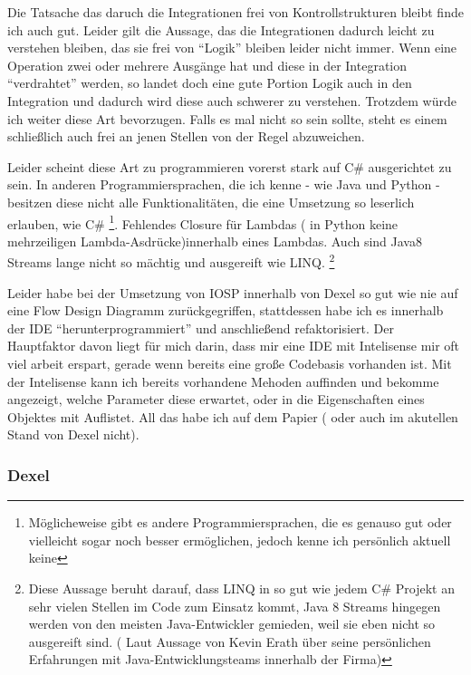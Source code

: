 Die Tatsache das daruch die Integrationen frei von Kontrollstrukturen bleibt finde ich auch gut. 
Leider gilt die Aussage, das die Integrationen dadurch leicht zu verstehen bleiben, das sie frei von \enquote{Logik} bleiben leider nicht immer. Wenn eine Operation zwei oder mehrere Ausgänge hat und diese in der Integration \enquote{verdrahtet} werden, so landet doch eine gute Portion Logik auch in den Integration und dadurch wird diese auch schwerer zu verstehen. 
Trotzdem würde ich weiter diese Art bevorzugen. Falls es mal nicht so sein sollte, steht es einem schließlich auch frei an jenen Stellen von der Regel abzuweichen.


Leider scheint diese Art zu programmieren  vorerst stark auf C\# ausgerichtet zu sein. In anderen Programmiersprachen, die ich kenne - wie Java und Python - besitzen diese nicht alle Funktionalitäten, die eine Umsetzung so leserlich erlauben, wie C\# \footnote{Möglicheweise gibt es andere Programmiersprachen, die es genauso gut oder vielleicht sogar noch besser ermöglichen, jedoch kenne ich persönlich aktuell keine }.
Fehlendes Closure für Lambdas ( in Python keine mehrzeiligen Lambda-Asdrücke)innerhalb eines Lambdas. 
Auch sind Java8 Streams lange nicht so mächtig und ausgereift wie LINQ. \footnote{Diese Aussage beruht darauf, dass LINQ in so gut wie jedem C\# Projekt an sehr vielen Stellen im Code zum Einsatz kommt, Java 8 Streams hingegen werden von den meisten Java-Entwickler gemieden, weil sie eben nicht so ausgereift sind. ( Laut Aussage von Kevin Erath über seine persönlichen Erfahrungen mit Java-Entwicklungsteams innerhalb der Firma)}

Leider habe bei der Umsetzung von IOSP innerhalb von Dexel so gut wie nie auf eine Flow Design Diagramm zurückgegriffen, stattdessen habe ich es innerhalb der IDE \enquote{herunterprogrammiert} und anschließend refaktorisiert. Der Hauptfaktor davon liegt für mich darin, dass mir eine IDE mit Intelisense mir oft viel arbeit erspart, gerade wenn bereits eine große Codebasis vorhanden ist.
Mit der Intelisense kann ich bereits vorhandene Mehoden auffinden und bekomme angezeigt, welche Parameter diese erwartet, oder in die Eigenschaften eines Objektes mit Auflistet.
All das habe ich auf dem Papier ( oder auch im akutellen Stand von Dexel nicht).



\subsubsection{Dexel}

